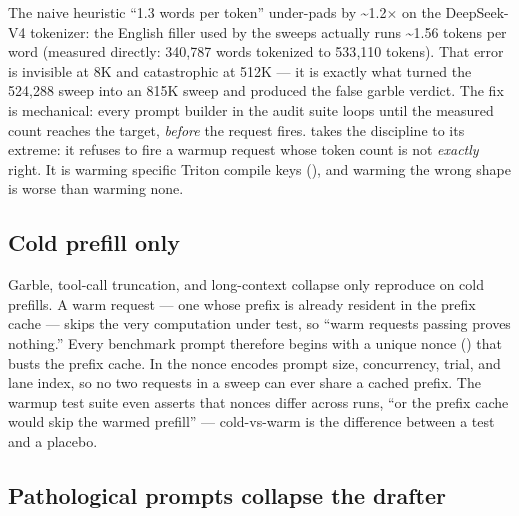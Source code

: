 The naive heuristic ``1.3 words per token'' under-pads by
\textasciitilde{}1.2$\times$ on the DeepSeek-V4 tokenizer: the English
filler used by the sweeps actually runs \textasciitilde{}1.56 tokens per
word (measured directly: 340{,}787 words tokenized to 533{,}110 tokens).
That error is invisible at 8K and catastrophic at 512K --- it is exactly
what turned the 524{,}288 sweep into an 815K sweep and produced the false
garble verdict. The fix is mechanical: every prompt builder in the audit
suite loops  until the measured count reaches the
target, \emph{before} the request fires. 
takes the discipline to its extreme: it refuses to fire a warmup request
whose token count is not \emph{exactly} right. It is warming specific
Triton compile keys (), and warming the wrong shape is worse
than warming none.

\subsection{Cold prefill only}

Garble, tool-call truncation, and long-context collapse only reproduce on
cold prefills. A warm request --- one whose prefix is already resident in
the prefix cache --- skips the very computation under test, so ``warm
requests passing proves nothing.'' Every benchmark prompt therefore begins
with a unique nonce () that busts the prefix
cache. In  the nonce encodes prompt size,
concurrency, trial, and lane index, so no two requests in a sweep can ever
share a cached prefix. The warmup test suite even asserts that nonces
differ across runs, ``or the prefix cache would skip the warmed prefill''
--- cold-vs-warm is the difference between a test and a placebo.

\subsection{Pathological prompts collapse the drafter}

